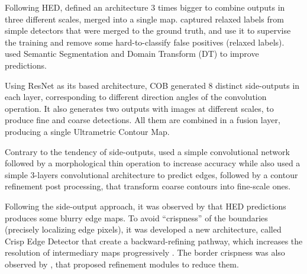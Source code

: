 
Following HED, \cite{Kokkinos:2016} defined an architecture 3 times bigger to combine outputs in three different scales, merged into a single map.
\cite{LearningRelaxed:2016:7780401} captured relaxed labels from simple detectors that were merged to the ground truth, and use it to supervise the training and remove some hard-to-classify false positives (relaxed labels).
\cite{SemanticSeg:2016:7780861} used Semantic Segmentation and Domain Transform (DT) to improve predictions.

Using ResNet \cite{RESNET:2016:7780459} as its based architecture, COB \cite{COB:2018:7917294} generated 8 distinct side-outputs in each layer, corresponding to different direction angles of the convolution operation.
It also generates two outputs with images at different scales, to produce fine and coarse detections.
All them are combined in a fusion layer, producing a single Ultrametric Contour Map. %

Contrary to the tendency of side-outputs, \cite{EdgeCNN:Wang201612} used a simple convolutional network followed by a morphological thin operation to increase accuracy while \cite{ContourDetect:2017:8124495} also used a simple 3-layers convolutional architecture to predict edges, followed by a contour refinement post processing, that transform coarse contours into fine-scale ones.

Following the side-output approach, it was observed by \cite{Wang:2017} that HED predictions produces some blurry edge maps.
To avoid ``crispness'' of the boundaries (precisely localizing edge pixels), it was developed a new architecture, called Crisp Edge Detector that create a backward-refining pathway, which increases the resolution of intermediary maps progressively \cite{Wang:2017}. 
The border crispness was also observed by \cite{CrispBoundaries:2018:Deng2018570}, that proposed refinement modules to reduce them.

